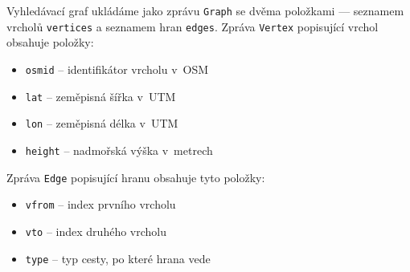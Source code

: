 Vyhledávací graf ukládáme jako zprávu \verb|Graph| se dvěma položkami ---
seznamem vrcholů \verb|vertices| a seznamem hran \verb|edges|. Zpráva
\verb|Vertex| popisující vrchol obsahuje položky:
\begin{itemize}
	\item \verb|osmid| -- identifikátor vrcholu v~OSM
	\item \verb|lat| -- zeměpisná šířka v~UTM
	\item \verb|lon| -- zeměpisná délka v~UTM
	\item \verb|height| -- nadmořská výška v~metrech
\end{itemize}
Zpráva \verb|Edge| popisující hranu obsahuje tyto položky:
\begin{itemize}
	\item \verb|vfrom| -- index prvního vrcholu
	\item \verb|vto| -- index druhého vrcholu
	\item \verb|type| -- typ cesty, po které hrana vede
\end{itemize}

